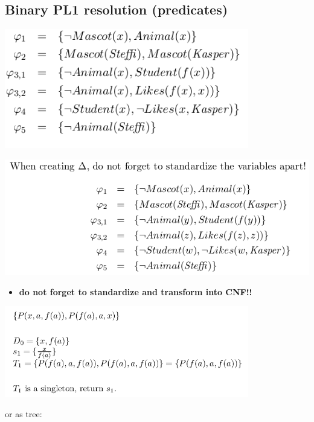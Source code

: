 \documentclass[conference]{styles/acmsiggraph}
\begin{document}
\subsection{Binary PL1 resolution (predicates)}

  \begin{minipage}[b]{0.5\linewidth}
  \includegraphics[width=0.8\textwidth]{imgs/clauses.png}
  \end{minipage} 
  \begin{minipage}[b]{0.5\linewidth}
  \includegraphics[width=\textwidth]{imgs/clauses2.png}
  \end{minipage}
  
\begin{itemize}
    \item \textbf{do not forget to standardize and transform into CNF!!}
\end{itemize}

\includegraphics[width=0.8\textwidth]{imgs/PL1.png}

or as tree:
\end{document}
